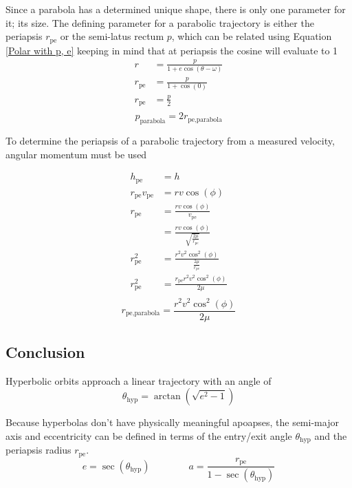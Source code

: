 \documentclass{article}
\begin{document}
Since a parabola has a determined unique shape, there is only one parameter for it; its size. The defining parameter for a parabolic trajectory is either the periapsis $r_\text{pe}$ or the semi-latus rectum $p$, which can be related using Equation \eqref{Polar with p, e} keeping in mind that at periapsis the cosine will evaluate to 1
\begin{align*}
    r           & =\frac{p}{1+e\cos(\theta-\omega)} \\
    r_\text{pe} & =\frac{p}{1+\cos(0)}              \\
    r_\text{pe} & =\frac{p}{2}                      \\
\end{align*}
\begin{equation}
    p_\text{parabola}=2r_\text{pe,parabola}
\end{equation}

To determine the periapsis of a parabolic trajectory from a measured velocity, angular momentum must be used

\begin{align*}
    h_\text{pe}            & = h                                                   \\
    r_\text{pe}v_\text{pe} & =rv\cos(\phi)                                         \\
    r_\text{pe}            & =\frac{rv\cos(\phi)}{v_\text{pe}}                     \\
                           & =\frac{rv\cos(\phi)}{\sqrt{\frac{2\mu}{r_\text{pe}}}} \\
    r_\text{pe}^2          & =\frac{r^2v^2\cos^2(\phi)}{\frac{2\mu}{r_\text{pe}}}  \\
    r_\text{pe}^2          & =\frac{r_\text{pe}r^2v^2\cos^2(\phi)}{2\mu}           \\
\end{align*}
\begin{equation}\label{Periapsis Radius Parabola}
    r_\text{pe,parabola}=\frac{r^2v^2\cos^2(\phi)}{2\mu}
\end{equation}

\bigskip\bigskip
\subsection{Conclusion}

\bigskip
Hyperbolic orbits approach a linear trajectory with an angle of
$$\theta_\text{hyp}=\arctan\left(\sqrt{e^2-1}\right)$$

\bigskip
Because hyperbolas don't have physically meaningful apoapses, the semi-major axis and eccentricity can be defined in terms of the entry/exit angle $\theta_\text{hyp}$ and the periapsis radius $r_\text{pe}$.
$$e=\sec(\theta_\text{hyp})\qquad\qquad a=\frac{{r_\text{pe}}}{1-\sec(\theta_\text{hyp})}$$
\end{document}
